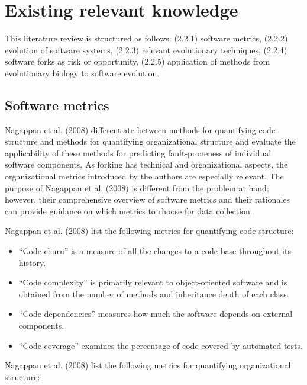 
\section{Existing relevant knowledge}

This literature review is structured as follows: (2.2.1) software metrics, (2.2.2) evolution of software systems, (2.2.3) relevant evolutionary techniques, (2.2.4) software forks as risk or opportunity, (2.2.5) application of methods from evolutionary biology to software evolution.

\subsection{Software metrics}
Nagappan et al. (2008) differentiate between methods for quantifying code structure and methods for quantifying organizational structure and evaluate the applicability of these methods for predicting fault-proneness of individual software components. As forking has technical and organizational aspects, the organizational metrics introduced by the authors are especially relevant. The purpose of Nagappan et al. (2008) is different from the problem at hand; however, their comprehensive overview of software metrics and their rationales can provide guidance on which metrics to choose for data collection.

\noindent
Nagappan et al. (2008) list the following metrics for quantifying code structure:

\begin{itemize}
  \item{“Code churn” is a measure of all the changes to a code base throughout its history.}
  \item{“Code complexity” is primarily relevant to object-oriented software and is obtained from the number of methods and inheritance depth of each class.}
  \item{“Code dependencies” measures how much the software depends on external components.}
  \item{“Code coverage” examines the percentage of code covered by automated tests.}
\end{itemize}

\noindent
Nagappan et al. (2008) list the following metrics for quantifying organizational structure:

